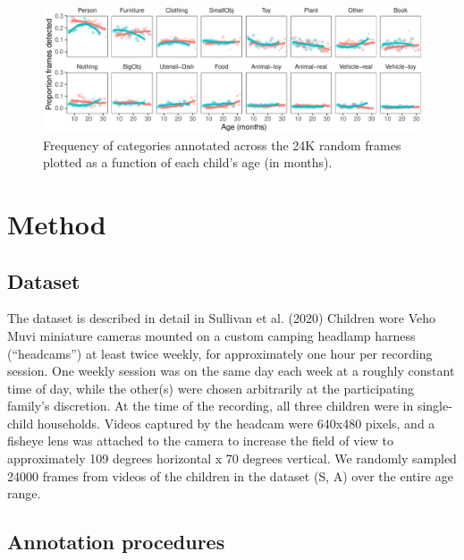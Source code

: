 \documentclass[10pt, letterpaper]{article}
\newenvironment{CodeChunk}{}{}
\begin{document}
\begin{CodeChunk}
\begin{figure}[h]

{\centering \includegraphics{figs/freq_by_category-1} 

}

\caption[Frequency of categories annotated across the 24K random frames plotted as a function of each child's age (in months)]{Frequency of categories annotated across the 24K random frames plotted as a function of each child's age (in months).}\label{fig:freq_by_category}
\end{figure}
\end{CodeChunk}

\hypertarget{method}{%
\section{Method}\label{method}}

\hypertarget{dataset}{%
\subsection{Dataset}\label{dataset}}

The dataset is described in detail in Sullivan et al. (2020) Children
wore Veho Muvi miniature cameras mounted on a custom camping headlamp
harness (``headcams'') at least twice weekly, for approximately one hour
per recording session. One weekly session was on the same day each week
at a roughly constant time of day, while the other(s) were chosen
arbitrarily at the participating family's discretion. At the time of the
recording, all three children were in single-child households. Videos
captured by the headcam were 640x480 pixels, and a fisheye lens was
attached to the camera to increase the field of view to approximately
109 degrees horizontal x 70 degrees vertical. We randomly sampled 24000
frames from videos of the children in the dataset (S, A) over the entire
age range.

\hypertarget{annotation-procedures}{%
\subsection{Annotation procedures}\label{annotation-procedures}}
\end{document}
